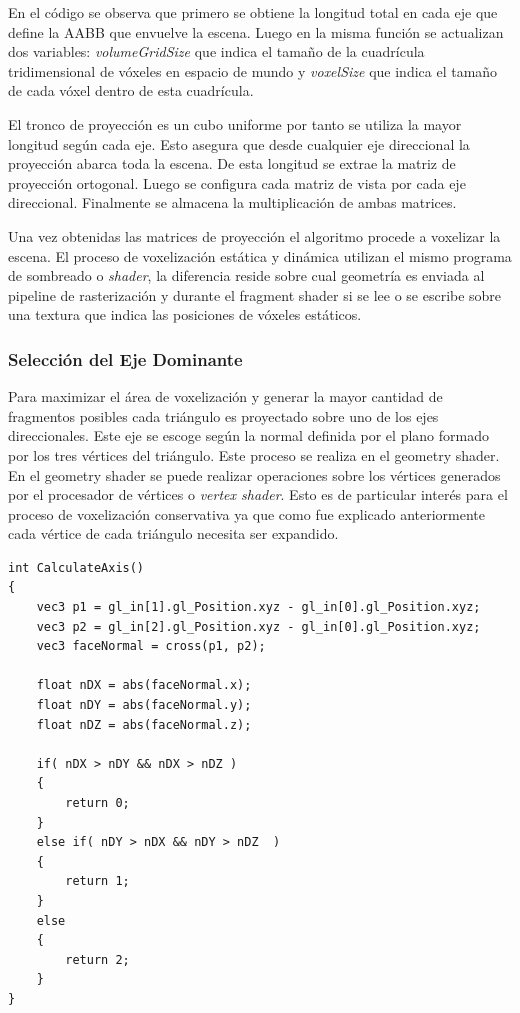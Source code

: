 En el código se observa que primero se obtiene la longitud total en cada eje que define la \ac{AABB} que envuelve la escena. Luego en la misma función se actualizan dos variables: \emph{volumeGridSize} que indica el tamaño de la cuadrícula tridimensional de vóxeles en espacio de mundo y \emph{voxelSize} que indica el tamaño de cada vóxel dentro de esta cuadrícula. 

El tronco de proyección es un cubo uniforme por tanto se utiliza la mayor longitud según cada eje. Esto asegura que desde cualquier eje direccional la proyección abarca toda la escena. De esta longitud se extrae la matriz de proyección ortogonal. Luego se configura cada matriz de vista por cada eje direccional. Finalmente se almacena la multiplicación de ambas matrices.

Una vez obtenidas las matrices de proyección el algoritmo procede a voxelizar la escena. El proceso de voxelización estática y dinámica utilizan el mismo programa de sombreado o \emph{shader}, la diferencia reside sobre cual geometría es enviada al pipeline de rasterización y durante el fragment shader si se lee o se escribe sobre una textura que indica las posiciones de vóxeles estáticos.

\subsubsection{Selección del Eje Dominante}
Para maximizar el área de voxelización y generar la mayor cantidad de fragmentos posibles cada triángulo es proyectado sobre uno de los ejes direccionales. Este eje se escoge según la normal definida por el plano formado por los tres vértices del triángulo. Este proceso se realiza en el geometry shader. En el geometry shader se puede realizar operaciones sobre los vértices generados por el procesador de vértices o \emph{vertex shader}. Esto es de particular interés para el proceso de voxelización conservativa ya que como fue explicado anteriormente cada vértice de cada triángulo necesita ser expandido.
\\
\begin{lstlisting}[caption={Selección del eje dominante para la proyección ortogonal.}, label=CalculateAxis]
int CalculateAxis()
{
	vec3 p1 = gl_in[1].gl_Position.xyz - gl_in[0].gl_Position.xyz;
	vec3 p2 = gl_in[2].gl_Position.xyz - gl_in[0].gl_Position.xyz;
	vec3 faceNormal = cross(p1, p2);

	float nDX = abs(faceNormal.x);
	float nDY = abs(faceNormal.y);
	float nDZ = abs(faceNormal.z);

	if( nDX > nDY && nDX > nDZ )
    {
		return 0;
	}
	else if( nDY > nDX && nDY > nDZ  )
    {
	    return 1;
    }
	else
    {
	    return 2;
	}
}
\end{lstlisting}

